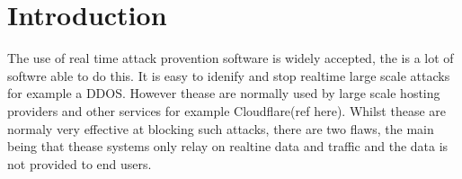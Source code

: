 
\chapter{Introduction}

The use of real time attack provention software is widely accepted, the is a lot of softwre able to do this. It is easy to idenify and stop realtime large scale attacks for example a DDOS. However thease are normally used by large scale hosting providers and other services for example Cloudflare(ref here). Whilst thease are normaly very effective at blocking such attacks, there are two flaws, the main being that thease systems only relay on realtine data and traffic and the data is not provided to end users.